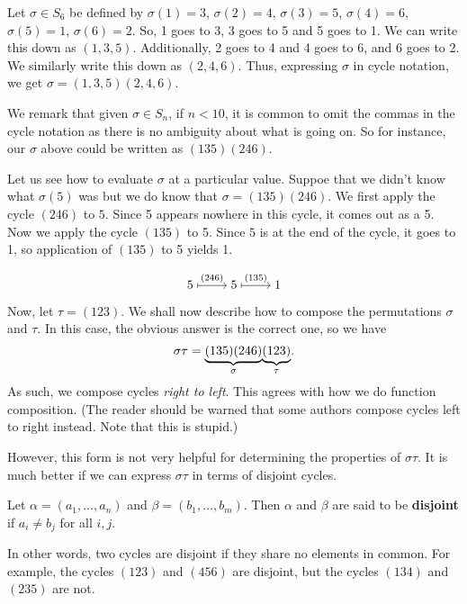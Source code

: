 \documentclass[./main.tex]{subfiles}
\begin{document}
Let $\sigma \in S_6$ be defined by $\sigma(1) = 3$, $\sigma(2) = 4$, $\sigma(3)
= 5$, $\sigma(4) = 6$, $\sigma(5) = 1$, $\sigma(6) = 2$. So, 1 goes to 3, 3 goes
to 5 and 5 goes to 1. We can write this down as $(1,3,5)$. Additionally, 2 goes
to 4 and 4 goes to 6, and 6 goes to 2. We similarly write this down as
$(2,4,6)$. Thus, expressing $\sigma$ in cycle notation, we get $\sigma =
(1,3,5)(2,4,6)$. 

We remark that given $\sigma \in S_n$, if $n < 10$, it is common to omit the
commas in the cycle notation as there is no ambiguity about what is going on. So
for instance, our $\sigma$ above could be written as $(135)(246)$.

Let us see how to evaluate $\sigma$ at a particular value. Suppoe that we didn't
know what $\sigma(5)$ was but we do know that $\sigma = (135)(246)$. We first
apply the cycle $(246)$ to $5$. Since 5 appears nowhere in this cycle, it comes
out as a 5. Now we apply the cycle $(135)$ to 5. Since $5$ is at the end of the
cycle, it goes to 1, so application of $(135)$ to 5 yields 1.

\[\begin{tikzcd}[cramped]
	5 & 5 & 1
	\arrow["{(246)}", maps to, from=1-1, to=1-2]
	\arrow["{(135)}", maps to, from=1-2, to=1-3]
\end{tikzcd}\]



Now, let $\tau = (123)$. We shall now describe how to compose the permutations
$\sigma$ and $\tau$. In this case, the obvious answer is the correct one,
so we have
\[
    \sigma \tau = {\underbrace{(135)(246)}_{\text{$\sigma$}}} {\underbrace{(123)}_{\text{$\tau$}}}.
\]
As such, we compose cycles \emph{right to left}. This agrees with how we do
function composition. (The reader should be warned that some authors compose
cycles left to right instead. Note that this is stupid.)

However, this form is not very helpful for determining the properties of
$\sigma\tau$. It is much better if we can express $\sigma \tau$ in terms of
disjoint cycles.

\begin{definition}
    Let $\alpha = (a_1, \dots, a_n)$ and $\beta = (b_1, \dots, b_m)$. Then
    $\alpha$ and $\beta$ are said to be \textbf{disjoint} if $a_i \neq b_j$ for
    all $i, j$.
\end{definition}
In other words, two cycles are disjoint if they share no elements in common. For
example, the cycles $(123)$ and $(456)$ are disjoint, but the cycles $(134)$ and
$(235)$ are not.
\end{document}
